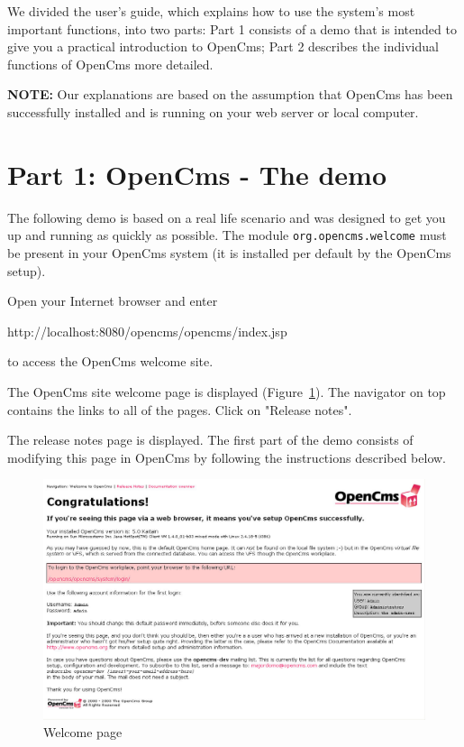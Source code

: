 We divided the user's guide, which explains how to use the system's
most important functions, into two parts: Part 1 consists of a
demo that is intended to give you a practical introduction to
OpenCms; Part 2 describes the individual functions of OpenCms 
more detailed.

\textbf{NOTE:} Our explanations are based on the assumption that
OpenCms has been successfully installed and is running on your web
server or local computer.
\newpage
\section{Part 1: OpenCms - The demo}

The following demo is based on a real life scenario and was
designed to get you up and running as quickly as possible.
The module \texttt{org.opencms.welcome} must be present in your OpenCms system
(it is installed per default by the OpenCms setup).

Open your Internet browser and enter

http://localhost:8080/opencms/opencms/index.jsp

to access the OpenCms welcome site.

The OpenCms site welcome page is displayed (Figure~\ref{demopage01}). The navigator on top contains
the links to all of the pages. Click on "Release notes".

The release notes page is displayed. The first
part of the demo consists of modifying this page in OpenCms by
following the instructions described below.

\begin{figure}[!hbt]
\begin{center}
\includegraphics[width=\sgw]
                   {pics/usermanual/demoPage01}
\caption[Welcome page]
           {Welcome page}
\label{demopage01}
\end{center}
\end{figure}

